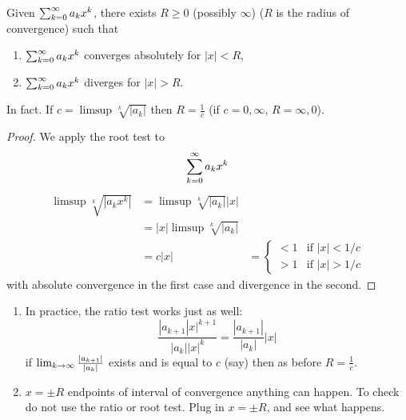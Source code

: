 \documentclass[10pt, a4paper]{article}
\begin{document}
\begin{theorem}
    Given $\infsumo a_kx ^ k$,
    there exists $R \geq 0$
    (possibly $\infty$)
    ($R$ is the radius of convergence)
    such that
    \begin{enumerate}[label = (\roman*)]
        \item $\infsumo a_kx ^ k$ converges absolutely for $|x| < R$,

        \item $\infsumo a_kx ^ k$ diverges for $|x| > R$.
    \end{enumerate}
    In fact.
    If $c = \limsup\sqrt[k]{|a_k|}$ then $R = \frac{1}{c}$
    (if $c = 0, \infty$,
    $R = \infty, 0$).
    
    \begin{proof}
        We apply the root test to
        \[
        \infsumo a_kx ^ k
        \]
        \begin{align*}
            \limsup\sqrt[k]{|a_kx ^ k|} &= \limsup\sqrt[k]{|a_k|}|x| \\
            &= |x|\limsup\sqrt[k]{|a_k|} \\
            &= c|x| &= \begin{cases}
                < 1 & \text{if } |x| < 1 / c \\
                > 1 & \text{if } |x| > 1 / c
            \end{cases}
        \end{align*}
        with absolute convergence in the first case and divergence in the second.
    \end{proof}
\end{theorem}

\begin{remark}
    \begin{enumerate}[label = (\roman*)]
        \item In practice,
        the ratio test works just as well:
        \[
        \frac{|a_{k + 1}|x| ^ {k + 1}}{|a_k||x| ^ k} = \frac{|a_{k + 1}|}{|a_k|}|x|
        \]
        if $\liminfty[k]\frac{|a_{k + 1}|}{|a_k|}$ exists and is equal to $c$
        (say)
        then as before $R = \frac{1}{c}$.

        \item $x = \pm R$ endpoints of interval of convergence anything can happen.
        To check do not use the ratio or root test.
        Plug in $x = \pm R$,
        and see what happens.
    \end{enumerate}
\end{remark}
\end{document}
